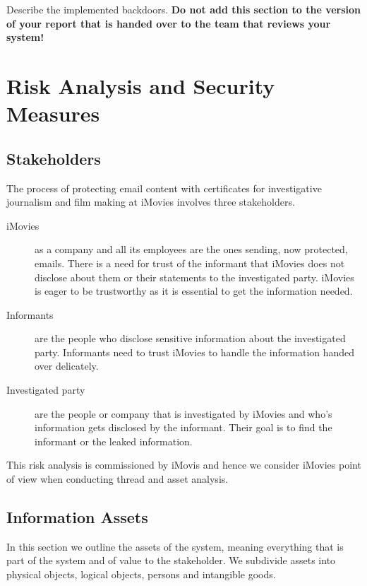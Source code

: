 \documentclass[a4paper, toc=index, 12pt, DIV14, twoside, BCOR2cm, headsepline, numbers=noenddot, bibliography=totoc]{scrbook}
\begin{document}
Describe the implemented backdoors. {\bfseries Do not add
    this section to the version of your report that is handed over to
    the team that reviews your system!}












\chapter{Risk Analysis and Security Measures}
\section{Stakeholders}
The process of protecting email content with certificates for investigative journalism and film making at iMovies involves three stakeholders.
\begin{description}
\item[iMovies] as a company and all its employees are the ones sending, now protected, emails. There is a need for trust of the informant that iMovies does not disclose about them or their statements to the investigated party. iMovies is eager to be trustworthy as it is essential to get the information needed. 
\item[Informants] are the people who disclose sensitive information about the investigated party. Informants need to trust iMovies to handle the information handed over delicately.
\item[Investigated party] are the people or company that is investigated by iMovies and who's information gets disclosed by the informant. Their goal is to find the informant or the leaked information.
\end{description}
This risk analysis is commissioned by iMovis and hence we consider iMovies point of view when conducting thread and asset analysis.

\section{Information Assets}
In this section we outline the assets of the system, meaning everything that is part of the system and of value to the stakeholder. We subdivide assets into physical objects, logical objects, persons and intangible goods.
\end{document}
